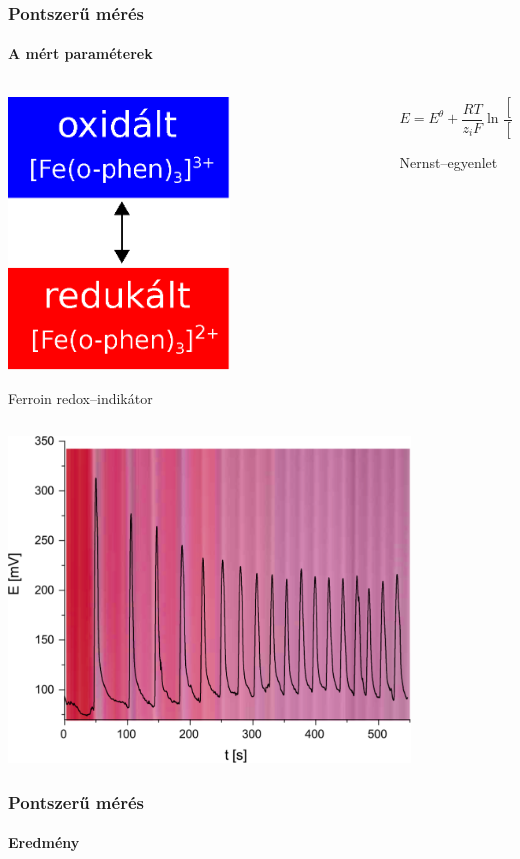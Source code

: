 \documentclass{beamer}
\begin{document}
\begin{frame}
\frametitle{Pontszerű mérés}
\framesubtitle{A mért paraméterek}
\begin{columns}[T] %
\begin{column}{.48\textwidth}

\centering
\includegraphics[width=0.6\textwidth]{ferroin.eps}

Ferroin redox--indikátor

\end{column}%
\hfill%
\begin{column}{.48\textwidth}
\centering


\begin{equation*}
        E=E^\theta + \frac{RT}{z_iF} \ln \frac{[Fe^{3+}]}{[Fe^{2+}]}
\end{equation*}

Nernst--egyenlet
\end{column}%
\end{columns}
\end{frame}


\begin{frame}
	\centering
	\includegraphics[width=0.8\textwidth]{pontszerumeres.eps}
	\frametitle{Pontszerű mérés}
	\framesubtitle{Eredmény}
\end{frame}
\end{document}
